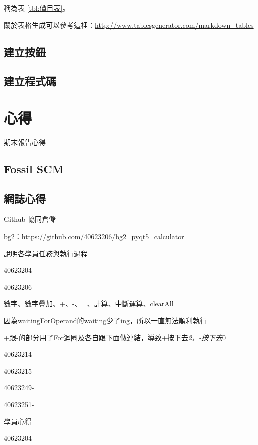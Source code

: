 \documentclass[12pt,,]{report}
\begin{document}
稱為表 \ref{tbl:價目表}。

關於表格生成可以參考這裡：\url{http://www.tablesgenerator.com/markdown_tables}

\hypertarget{ux5efaux7acbux6309ux9215}{%
\section{建立按鈕}\label{ux5efaux7acbux6309ux9215}}

\hypertarget{ux5efaux7acbux7a0bux5f0fux78bc}{%
\section{建立程式碼}\label{ux5efaux7acbux7a0bux5f0fux78bc}}

\hypertarget{ux5fc3ux5f97}{%
\chapter{心得}\label{ux5fc3ux5f97}}

期末報告心得

\hypertarget{fossil-scm}{%
\section{Fossil SCM}\label{fossil-scm}}

\hypertarget{ux7db2ux8a8cux5fc3ux5f97}{%
\section{網誌心得}\label{ux7db2ux8a8cux5fc3ux5f97}}

Github 協同倉儲

bg2：https://github.com/40623206/bg2\_pyqt5\_calculator

說明各學員任務與執行過程

40623204-

40623206

數字、數字疊加、+、-、=、計算、中斷運算、clearAll

因為waitingForOperand的waiting少了ing，所以一直無法順利執行

+跟-的部分用了For迴圈及各自跟下面做連結，導致+按下去\emph{2，-按下去}0

40623214-

40623215-

40623249-

40623251-

學員心得

40623204-
\end{document}
